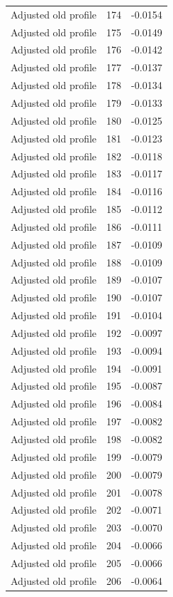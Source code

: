 \begin{table}[htbp]
\begin{tabular}{lll}
Adjusted old profile & 174 & -0.0154 \\
Adjusted old profile & 175 & -0.0149 \\
Adjusted old profile & 176 & -0.0142 \\
Adjusted old profile & 177 & -0.0137 \\
Adjusted old profile & 178 & -0.0134 \\
Adjusted old profile & 179 & -0.0133 \\
Adjusted old profile & 180 & -0.0125 \\
Adjusted old profile & 181 & -0.0123 \\
Adjusted old profile & 182 & -0.0118 \\
Adjusted old profile & 183 & -0.0117 \\
Adjusted old profile & 184 & -0.0116 \\
Adjusted old profile & 185 & -0.0112 \\
Adjusted old profile & 186 & -0.0111 \\
Adjusted old profile & 187 & -0.0109 \\
Adjusted old profile & 188 & -0.0109 \\
Adjusted old profile & 189 & -0.0107 \\
Adjusted old profile & 190 & -0.0107 \\
Adjusted old profile & 191 & -0.0104 \\
Adjusted old profile & 192 & -0.0097 \\
Adjusted old profile & 193 & -0.0094 \\
Adjusted old profile & 194 & -0.0091 \\
Adjusted old profile & 195 & -0.0087 \\
Adjusted old profile & 196 & -0.0084 \\
Adjusted old profile & 197 & -0.0082 \\
Adjusted old profile & 198 & -0.0082 \\
Adjusted old profile & 199 & -0.0079 \\
Adjusted old profile & 200 & -0.0079 \\
Adjusted old profile & 201 & -0.0078 \\
Adjusted old profile & 202 & -0.0071 \\
Adjusted old profile & 203 & -0.0070 \\
Adjusted old profile & 204 & -0.0066 \\
Adjusted old profile & 205 & -0.0066 \\
Adjusted old profile & 206 & -0.0064 \\

\end{tabular}
\end{table}
